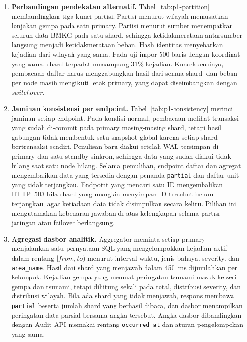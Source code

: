 \begin{enumerate}
\item \textbf{Perbandingan pendekatan alternatif.} Tabel~\ref{tab:p1-partition} membandingkan tiga kunci partisi. Partisi menurut wilayah memusatkan lonjakan gempa pada satu primary. Partisi menurut sumber menempatkan seluruh data BMKG pada satu shard, sehingga ketidakmerataan antarsumber langsung menjadi ketidakmerataan beban. Hash identitas menyebarkan kejadian dari wilayah yang sama. Pada uji impor 500 baris dengan koordinat yang sama, shard terpadat menampung 31\% kejadian. Konsekuensinya, pembacaan daftar harus menggabungkan hasil dari semua shard, dan beban per node masih mengikuti letak primary, yang dapat diseimbangkan dengan \emph{switchover}.

\item \textbf{Jaminan konsistensi per endpoint.} Tabel~\ref{tab:p1-consistency} merinci jaminan setiap endpoint. Pada kondisi normal, pembacaan melihat transaksi yang sudah di-commit pada primary masing-masing shard, tetapi hasil gabungan tidak membentuk satu snapshot global karena setiap shard bertransaksi sendiri. Penulisan baru diakui setelah WAL tersimpan di primary dan satu standby sinkron, sehingga data yang sudah diakui tidak hilang saat satu node hilang. Selama pemulihan, endpoint daftar dan agregat mengembalikan data yang tersedia dengan penanda \texttt{partial} dan daftar unit yang tidak terjangkau. Endpoint yang mencari satu ID mengembalikan HTTP~503 bila shard yang mungkin menyimpan ID tersebut belum terjangkau, agar ketiadaan data tidak disimpulkan secara keliru. Pilihan ini mengutamakan kebenaran jawaban di atas kelengkapan selama partisi jaringan atau failover berlangsung.

\item \textbf{Agregasi dasbor analitik.} Aggregator meminta setiap primary menjalankan satu pernyataan SQL yang mengelompokkan kejadian aktif dalam rentang $[\textit{from},\textit{to})$ menurut interval waktu, jenis bahaya, severity, dan \texttt{area\_name}. Hasil dari shard yang menjawab dalam 450~ms dijumlahkan per kelompok. Kejadian gempa yang memuat peringatan tsunami masuk ke seri gempa dan tsunami, tetapi dihitung sekali pada total, distribusi severity, dan distribusi wilayah. Bila ada shard yang tidak menjawab, respons membawa \texttt{partial} beserta jumlah shard yang berhasil dibaca, dan dasbor menampilkan peringatan data parsial bersama angka tersebut. Angka dasbor dibandingkan dengan Audit API memakai rentang \texttt{occurred\_at} dan aturan pengelompokan yang sama.
\end{enumerate}
